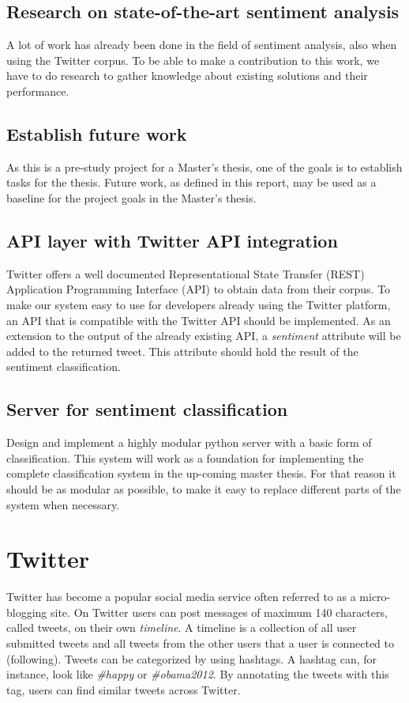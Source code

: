 	\subsection{Research on state-of-the-art sentiment analysis}
	A lot of work has already been done in the field of sentiment analysis, also when using the Twitter corpus. To be able to make a contribution to this work, we have to do research to gather knowledge about existing solutions and their performance.
	
	\subsection{Establish future work}
	As this is a pre-study project for a Master's thesis, one of the goals is to establish tasks for the thesis. Future work, as defined in this report, may be used as a baseline for the project goals in the Master's thesis.
	
	\subsection{API layer with Twitter API integration}
	Twitter offers a well documented Representational State Transfer (REST) Application Programming Interface (API) to obtain data from their corpus. To make our system easy to use for developers already using the Twitter platform, an API that is compatible with the Twitter API should be implemented. As an extension to the output of the already existing API, a \emph{sentiment} attribute will be added to the returned tweet. This attribute should hold the result of the sentiment classification.
	
	\subsection{Server for sentiment classification}
	Design and implement a highly modular python server with a basic form of classification. This system will work as a foundation for implementing the complete classification system in the up-coming master thesis. For that reason it should be as modular as possible, to make it easy to replace different parts of the system when necessary.

	

\section{Twitter}

Twitter has become a popular social media service often referred to as a micro-blogging site. On Twitter users can post messages of maximum 140 characters, called tweets, on their own \emph{timeline}. A timeline is a collection of all user submitted tweets and all tweets from the other users that a user is connected to (following). Tweets can be categorized by using hashtags. A hashtag can, for instance, look like \emph{\#happy} or \emph{\#obama2012}. By annotating the tweets with this tag, users can find similar tweets across Twitter.

